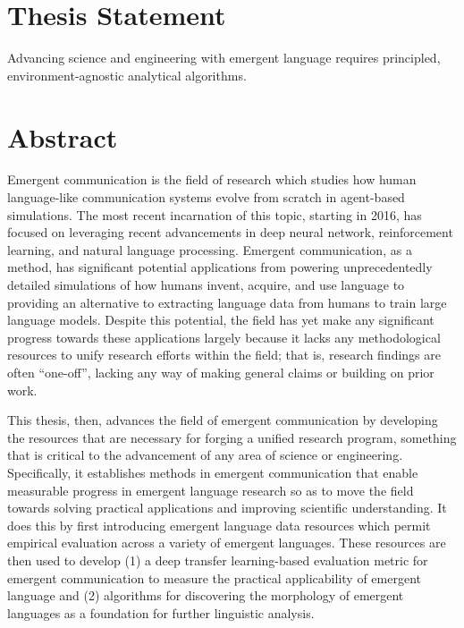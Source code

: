 \null\vfill

\section*{Thesis Statement}
Advancing science and engineering with emergent language requires principled, environment-agnostic analytical algorithms.

\section*{Abstract}
Emergent communication is the field of research which studies how human language-like communication systems evolve from scratch in agent-based simulations.
The most recent incarnation of this topic, starting in 2016, has focused on leveraging recent advancements in deep neural network, reinforcement learning, and natural language processing.
Emergent communication, as a method, has significant potential applications from powering unprecedentedly detailed simulations of how humans invent, acquire, and use language
  to providing an alternative to extracting language data from humans to train large language models.
Despite this potential, the field has yet make any significant progress towards these applications largely because it lacks any methodological resources to unify research efforts within the field;
  that is, research findings are often ``one-off'', lacking any way of making general claims or building on prior work.

This thesis, then, advances the field of emergent communication by developing the resources that are necessary for forging a unified research program, something that is critical to the advancement of any area of science or engineering.
Specifically, it establishes methods in emergent communication that enable measurable progress in emergent language research so as to move the field towards solving practical applications and improving scientific understanding.
It does this by first introducing emergent language data resources which permit empirical evaluation across a variety of emergent languages.
These resources are then used to develop
  (1) a deep transfer learning-based evaluation metric for emergent communication to measure the practical applicability of emergent language
  and (2) algorithms for discovering the morphology of emergent languages as a foundation for further linguistic analysis.

\vfill

